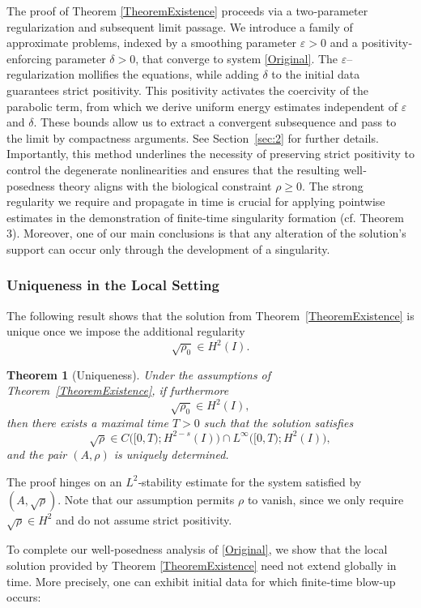 \documentclass[12pt]{amsart}
\newtheorem{theorem}{Theorem}
\begin{document}
The proof of Theorem \ref{TheoremExistence} proceeds via a two‐parameter regularization and subsequent limit passage. We introduce a family of approximate problems, indexed by a smoothing parameter $\varepsilon>0$ and a positivity‐enforcing parameter $\delta>0$, that converge to system \eqref{Original}. The $\varepsilon$–regularization mollifies the equations, while adding $\delta$ to the initial data guarantees strict positivity. This positivity activates the coercivity of the parabolic term, from which we derive uniform energy estimates independent of $\varepsilon$ and $\delta$. These bounds allow us to extract a convergent subsequence and pass to the limit by compactness arguments. See Section~\ref{sec:2} for further details. Importantly, this method underlines the necessity of preserving strict positivity to control the degenerate nonlinearities and ensures that the resulting well‐posedness theory aligns with the biological constraint $\rho\ge0$.  The strong regularity we require and propagate in time is crucial for applying pointwise estimates in the demonstration of finite‐time singularity formation (cf. Theorem 3).  Moreover, one of
our main conclusions is that any alteration of the solution’s support
can occur only through the development of a singularity.


\subsubsection*{\textbf{Uniqueness in the Local Setting}}
The following result shows that the solution from Theorem~\ref{TheoremExistence} is unique once we impose the additional regularity
\[
\sqrt{\rho_{0}}\in H^{2}(I).
\]

\begin{theorem}[Uniqueness]\label{TheoremUniqueness}
Under the assumptions of Theorem~\ref{TheoremExistence}, if furthermore
\[
\sqrt{\rho_{0}}\in H^{2}(I),
\]
then  there exists a maximal time $T>0$ such that the solution satisfies
\[
\sqrt{\rho}\in C \bigl([0,T);H^{2-s}(I)\bigr) \cap L^\infty \bigl([0,T);H^{2}(I)\bigr),
\]
and the pair $(A,\rho)$ is uniquely determined.
\end{theorem}

The proof hinges on an $L^2$‐stability estimate for the system satisfied by $(A,\sqrt{\rho})$. Note that our assumption permits $\rho$ to vanish, since we only require $\sqrt{\rho}\in H^2$ and do not assume strict positivity. 

To complete our well‐posedness analysis of \eqref{Original}, we show that the local solution provided by Theorem \ref{TheoremExistence} need not extend globally in time.  More precisely, one can exhibit initial data for which finite‐time blow‐up occurs:
\end{document}
